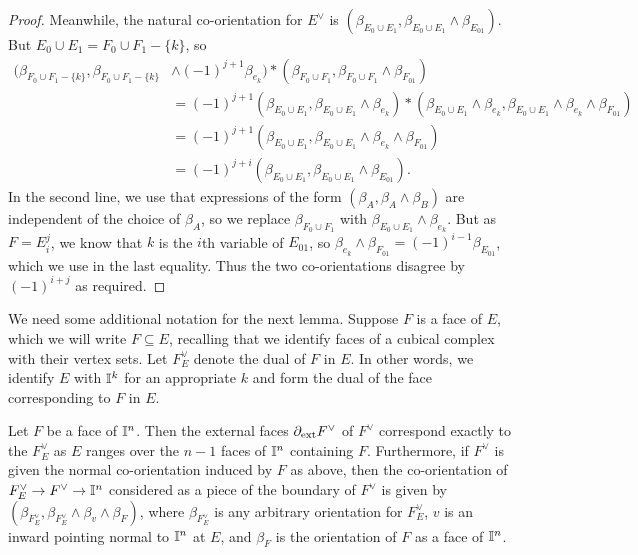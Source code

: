 \begin{proof}
	Meanwhile, the natural co-orientation for $E^\vee$ is $(\beta_{E_0 \cup E_1},\beta_{E_0 \cup E_1} \wedge \beta_{E_{01}}).$
	But $E_0 \cup E_1 = F_0 \cup F_1 - \{k\}$, so
	\begin{align*}
		(\beta_{F_0 \cup F_1 - \{k\}},\beta_{F_0 \cup F_1 - \{k\}}& \wedge (-1)^{j+1} \beta_{e_k})*(\beta_{F_0 \cup F_1},\beta_{F_0 \cup F_1} \wedge \beta_{F_{01}})\\
		& = (-1)^{j+1}(\beta_{E_0 \cup E_1},\beta_{E_0 \cup E_1} \wedge \beta_{e_k})*(\beta_{E_0 \cup E_1} \wedge \beta_{e_k},\beta_{E_0 \cup E_1} \wedge \beta_{e_k} \wedge \beta_{F_{01}})\\
		& = (-1)^{j+1}(\beta_{E_0 \cup E_1},\beta_{E_0 \cup E_1} \wedge \beta_{e_k} \wedge \beta_{F_{01}})\\
		& = (-1)^{j+i}(\beta_{E_0 \cup E_1},\beta_{E_0 \cup E_1} \wedge \beta_{E_{01}}).
	\end{align*}
	In the second line, we use that expressions of the form $(\beta_A, \beta_A \wedge \beta_B)$ are independent of the choice of $\beta_A$, so we replace $\beta_{F_0 \cup F_1}$ with $\beta_{E_0 \cup E_1} \wedge \beta_{e_k}$.
	But as $F = E_i^j$, we know that $k$ is the $i$th variable of $E_{01}$, so
	$\beta_{e_k} \wedge \beta_{F_{01}} = (-1)^{i-1}\beta_{E_{01}}$, which we use in the last equality.
	Thus the two co-orientations disagree by $(-1)^{i+j}$ as required.
\end{proof}


We need some additional notation for the next lemma.
Suppose $F$ is a face of $E$, which we will write $F \subseteq E$, recalling that we identify faces of a cubical complex with their vertex sets.
Let $F_E^\vee$ denote the dual of $F$ in $E$.
In other words, we identify $E$ with $\mathbb{I}^k$ for an appropriate $k$ and form the dual of the face corresponding to $F$ in $E$.

\begin{lemma}\label{L: ext faces}
	Let $F$ be a face of $\mathbb{I}^n$.
	Then the external faces $\partial_{\text{ext}}F^\vee$ of $F^\vee$ correspond exactly to the $F_E^\vee$ as $E$ ranges over the $n-1$ faces of $\mathbb{I}^n$ containing $F$.
	Furthermore, if $F^\vee$ is given the normal co-orientation induced by $F$ as above, then the co-orientation of $F^\vee_E \to F^\vee \to \mathbb{I}^n$ considered as a piece of the boundary of $F^\vee$ is given by $(\beta_{F_E^\vee},\beta_{F_E^\vee} \wedge \beta_v \wedge \beta_F)$, where $\beta_{F_E^\vee}$ is any arbitrary orientation for $F_E^\vee$, $v$ is an inward pointing normal to $\mathbb{I}^n$ at $E$, and $\beta_F$ is the orientation of $F$ as a face of $\mathbb{I}^n$.
\end{lemma}

